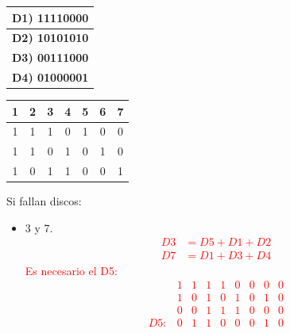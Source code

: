 \documentclass{templateNote}
\begin{document}
\begin{itemize}
    \begin{minipage}{0.5\textwidth}
        \begin{center}
            \begin{tabular}{|c|}
                \hline
                \textbf{D1) 11110000} \\
                \hline
                \textbf{D2) 10101010} \\
                \hline
                \textbf{D3) 00111000} \\
                \hline
                \textbf{D4) 01000001} \\
                \hline
            \end{tabular}
        \end{center}
    \end{minipage}
    \hfill
    \begin{minipage}{0.5\textwidth}
        \begin{tabular}{|c|c|c|c|c|c|c|}
            \hline
            1 & 2 & 3 & 4 & 5 & 6 & 7 \\ \hline
            1 & 1 & 1 & 0 & 1 & 0 & 0 \\
            1 & 1 & 0 & 1 & 0 & 1 & 0 \\
            1 & 0 & 1 & 1 & 0 & 0 & 1 \\ \hline
        \end{tabular}
    \end{minipage}
    Si fallan discos:
    \begin{itemize}
        \item 3 y 7.
        \textcolor{red}{
            \begin{align*}
                D3 &= D5 + D1 + D2 \\
                D7 &= D1 + D3 + D4
            \end{align*}
            Es necesario el D5:
            \begin{equation*}
                \begin{array}{ccccccccc}
                    & 1 & 1 & 1 & 1 & 0 & 0 & 0 & 0 \\
                    & 1 & 0 & 1 & 0 & 1 & 0 & 1 & 0 \\
                    & 0 & 0 & 1 & 1 & 1 & 0 & 0 & 0 \\ \hline
                D5: & 0 & 1 & 1 & 0 & 0 & 0 & 1 & 0 \\
                \end{array}
            \end{equation*}
}
\end{itemize}
\end{itemize}
\end{document}
